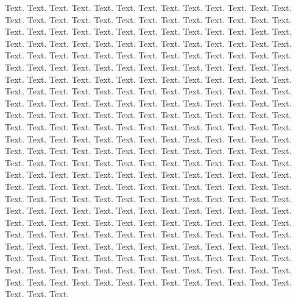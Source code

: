 \documentclass{article}
\begin{document}
Text. Text. Text. Text. Text. Text. Text. Text. Text. Text. Text. Text. Text. Text. Text.
Text. Text. Text. Text. Text. Text. Text. Text. Text. Text. Text. Text. Text. Text. Text.
Text. Text. Text. Text. Text. Text. Text. Text. Text. Text. Text. Text. Text. Text. Text.
Text. Text. Text. Text. Text. Text. Text. Text. Text. Text. Text. Text. Text. Text. Text.
Text. Text. Text. Text. Text. Text. Text. Text. Text. Text. Text. Text. Text. Text. Text.
Text. Text. Text. Text. Text. Text. Text. Text. Text. Text. Text. Text. Text. Text. Text.
Text. Text. Text. Text. Text. Text. Text. Text. Text. Text. Text. Text. Text. Text. Text.
Text. Text. Text. Text. Text. Text. Text. Text. Text. Text. Text. Text. Text. Text. Text.
Text. Text. Text. Text. Text. Text. Text. Text. Text. Text. Text. Text. Text. Text. Text.
Text. Text. Text. Text. Text. Text. Text. Text. Text. Text. Text. Text. Text. Text. Text.
Text. Text. Text. Text. Text. Text. Text. Text. Text. Text. Text. Text. Text. Text. Text.
Text. Text. Text. Text. Text. Text. Text. Text. Text. Text. Text. Text. Text. Text. Text.
Text. Text. Text. Text. Text. Text. Text. Text. Text. Text. Text. Text. Text. Text. Text.
Text. Text. Text. Text. Text. Text. Text. Text. Text. Text. Text. Text. Text. Text. Text.
Text. Text. Text. Text. Text. Text. Text. Text. Text. Text. Text. Text. Text. Text. Text.
Text. Text. Text. Text. Text. Text. Text. Text. Text. Text. Text. Text. Text. Text. Text.
Text. Text. Text. Text. Text. Text. Text. Text. Text. Text. Text. Text. Text. Text. Text.
Text. Text. Text. Text. Text. Text. Text. Text. Text. Text. Text. Text. Text. Text. Text.
Text. Text. Text. Text. Text. Text. Text. Text. Text. Text. Text. Text. Text. Text. Text.
Text. Text. Text. Text. Text. Text. Text. Text. Text. Text. Text. Text. Text. Text. Text.
Text. Text. Text. Text. Text. Text. Text. Text. Text. Text. Text. Text. Text. Text. Text.
\end{document}
